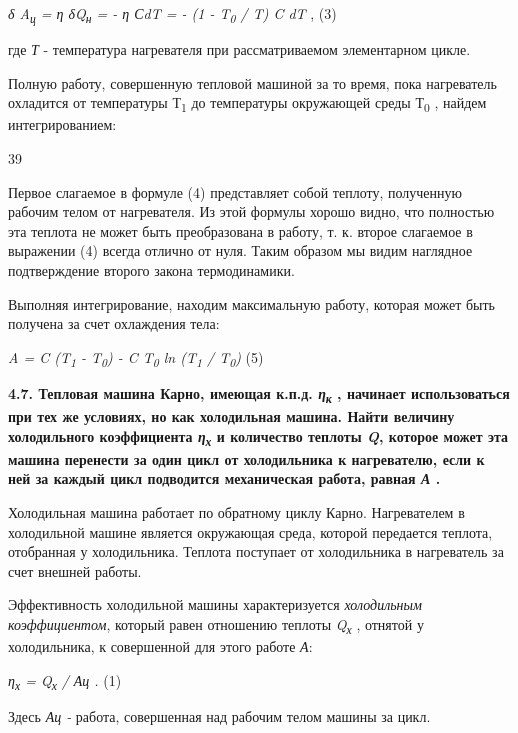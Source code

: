 \emph{δ A\textsubscript{ц} = η δQ\textsubscript{н} = - η СdT = - (1 -
T\textsubscript{0} / T) C dT} , (3)

где \emph{Т} - температура нагревателя при рассматриваемом элементарном
цикле.

Полную работу, совершенную тепловой машиной за то время, пока
нагреватель охладится от температуры Т\textsubscript{1} до температуры
окружающей среды Т\textsubscript{0} , найдем интегрированием:

39


Первое слагаемое в формуле (4) представляет собой теплоту, полученную
рабочим телом от нагревателя. Из этой формулы хорошо видно, что
полностью эта теплота не может быть преобразована в работу, т. к. второе
слагаемое в выражении (4) всегда отлично от нуля. Таким образом мы видим
наглядное подтверждение второго закона термодинамики.

Выполняя интегрирование, находим максимальную работу, которая может быть
получена за счет охлаждения тела:

\emph{A = C (T\textsubscript{1} - T\textsubscript{0}) - C
T\textsubscript{0} ln (T\textsubscript{1} / T\textsubscript{0})} (5)

\textbf{4.7. Тепловая машина Карно, имеющая к.п.д.
\emph{η\textsubscript{к}} , начинает использоваться при тех же условиях,
но как холодильная машина. Найти величину холодильного коэффициента
\emph{η\textsubscript{х}} и количество теплоты \emph{Q}, которое может
эта машина перенести за один цикл от холодильника к нагревателю, если к
ней за каждый цикл подводится механическая работа, равная \emph{А} .}

\solving{}

Холодильная машина работает по обратному циклу Карно. Нагревателем в
холодильной машине является окружающая среда, которой передается
теплота, отобранная у холодильника. Теплота поступает от холодильника в
нагреватель за счет внешней работы.

Эффективность холодильной машины характеризуется \emph{холодильным
коэффициентом}, который равен отношению теплоты
\emph{Q\textsubscript{х}} , отнятой у холодильника, к совершенной для
этого работе \emph{А}:

\emph{η\textsubscript{х} = Q\textsubscript{х} /} \emph{Ац .} (1)

Здесь \emph{Ац -} работа, совершенная над рабочим телом машины за цикл.


